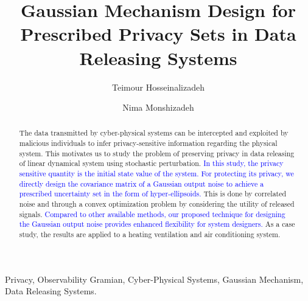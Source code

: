\documentclass{ifacconf}
\newcommand{\+}{\mathsmaller{+}}
\newcommand{\blue}[1]{\textcolor{blue}{#1}}
\begin{document}
\begin{frontmatter}
	
	
\title{Gaussian Mechanism Design for Prescribed Privacy Sets in Data Releasing Systems} 
%

%
%
%

\author[First]{Teimour Hosseinalizadeh} 
\author[First]{Nima Monshizadeh}
%

\address[First]{Engineering and Technology
	Institute Groningen, University of Groningen, $9747$ AG Groningen ,The Netherlands (e-mail: \{t.hosseinalizadeh, n.monshizadeh\}@rug.nl).}
%
%
%
%

\begin{abstract}
The data transmitted by cyber-physical systems can be intercepted and exploited by malicious individuals to infer privacy-sensitive information regarding the physical system. 
This motivates us to study the problem of preserving privacy in data releasing of linear dynamical system using stochastic perturbation. \blue{In this study, the privacy sensitive quantity is the initial state value of the system. For protecting its privacy, we directly design the covariance matrix of a Gaussian output noise to achieve a prescribed uncertainty set in the form of hyper-ellipsoids.}
This is done by correlated noise and through a convex optimization problem by considering the utility of released signals. 
\blue{Compared to other available methods, our proposed technique for designing the Gaussian output noise provides enhanced flexibility for system designers. }
As a case study, the results are applied to a heating ventilation and air conditioning system.
\end{abstract}

\begin{keyword}
Privacy, Observability Gramian, Cyber-Physical Systems, Gaussian Mechanism, Data Releasing Systems.
\end{keyword}

\end{frontmatter}
%
\end{document}
